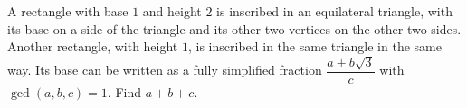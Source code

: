 A rectangle with base $1$ and height $2$ is inscribed in an equilateral triangle, with its base on a side of the triangle and its other two vertices on the other two sides. Another rectangle, with height $1$, is inscribed in the same triangle in the same way. Its base can be written as a fully simplified fraction $\dfrac{a+b\sqrt3}{c}$ with $\gcd(a,b,c)=1$. Find $a+b+c$.
